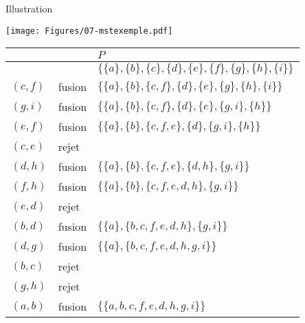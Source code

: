 \begin{frame}{Illustration}

\centerline{\texttt{[image: Figures/07-mstexemple.pdf]}}
\begin{center}
\footnotesize
\begin{tabular}{lll}
& & $P$\\
\hline
 & & $\{\{a\},\{b\},\{c\},\{d\},\{e\},\{f\},\{g\},\{h\},\{i\}\}$\\
\alert{$(c,f)$} & fusion & $\{\{a\},\{b\},\{c,f\},\{d\},\{e\},\{g\},\{h\},\{i\}\}$\\
\alert{$(g,i)$} & fusion & $\{\{a\},\{b\},\{c,f\},\{d\},\{e\},\{g,i\},\{h\}\}$\\
\alert{$(e,f)$} & fusion & $\{\{a\},\{b\},\{c,f,e\},\{d\},\{g,i\},\{h\}\}$\\
$(c,e)$ & rejet & \\
\alert{$(d,h)$} & fusion & $\{\{a\},\{b\},\{c,f,e\},\{d,h\},\{g,i\}\}$\\
\alert{$(f,h)$} & fusion & $\{\{a\},\{b\},\{c,f,e,d,h\},\{g,i\}\}$\\
$(e,d)$ & rejet & \\
\alert{$(b,d)$} & fusion & $\{\{a\},\{b,c,f,e,d,h\},\{g,i\}\}$\\
\alert{$(d,g)$} & fusion & $\{\{a\},\{b,c,f,e,d,h,g,i\}\}$\\
$(b,c)$ & rejet & \\
$(g,h)$ & rejet & \\
\alert{$(a,b)$} & fusion & $\{\{a,b,c,f,e,d,h,g,i\}\}$\\
\end{tabular}
\end{center}

\end{frame}

